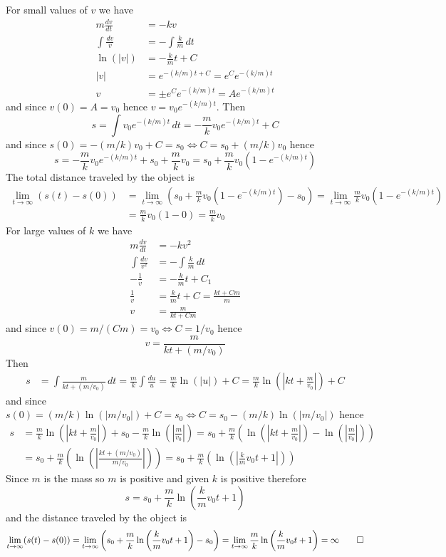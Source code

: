 \begin{solution}
    For small values of \(v\) we have
    \begin{align*}
        m\frac{dv}{dt} &= -kv \\
        \int\frac{dv}{v} &= -\int\frac{k}{m}\,dt \\
        \ln(|v|) &= -\frac{k}{m}t+C \\
        |v| &= e^{-(k/m)t+C}=e^Ce^{-(k/m)t} \\
        v &= \pm e^Ce^{-(k/m)t}=Ae^{-(k/m)t}
    \end{align*}
    and since \(v(0)=A=v_0\) hence \(v=v_0e^{-(k/m)t}\).
    Then
    \[s=\int v_0e^{-(k/m)t}\,dt=-\frac{m}{k}v_0e^{-(k/m)t}+C\]
    and since \(s(0)=-(m/k)v_0+C=s_0\iff C=s_0+(m/k)v_0\) hence
    \[s=-\frac{m}{k}v_0e^{-(k/m)t}+s_0+\frac{m}{k}v_0
    =s_0+\frac{m}{k}v_0(1-e^{-(k/m)t})\]
    The total distance traveled by the object is
    \begin{align*}
        \lim_{t\to\infty}(s(t)-s(0))
        &= \lim_{t\to\infty}\left(s_0+\frac{m}{k}v_0(1-e^{-(k/m)t})-s_0\right)
        =\lim_{t\to\infty}\frac{m}{k}v_0(1-e^{-(k/m)t}) \\
        &= \frac{m}{k}v_0(1-0)=\frac{m}{k}v_0
    \end{align*}
    For large values of \(k\) we have
    \begin{align*}
        m\frac{dv}{dt} &= -kv^2 \\
        \int\frac{dv}{v^2} &= -\int\frac{k}{m}\,dt \\
        -\frac{1}{v} &= -\frac{k}{m}t+C_1 \\
        \frac{1}{v} &= \frac{k}{m}t+C=\frac{kt+Cm}{m} \\
        v &= \frac{m}{kt+Cm}
    \end{align*}
    and since \(v(0)=m/(Cm)=v_0\iff C=1/v_0\) hence
    \[v=\frac{m}{kt+(m/v_0)}\]
    Then
    \begin{align*}
        s &= \int\frac{m}{kt+(m/v_0)}\,dt=\frac{m}{k}\int\frac{du}{u}
        =\frac{m}{k}\ln(|u|)+C
        =\frac{m}{k}\ln\left(\left|kt+\frac{m}{v_0}\right|\right)+C
    \end{align*}
    and since \(s(0)=(m/k)\ln(|m/v_0|)+C=s_0\iff C=s_0-(m/k)\ln(|m/v_0|)\)
    hence
    \begin{align*}
        s &= \frac{m}{k}\ln\left(\left|kt+\frac{m}{v_0}\right|\right)+s_0
        -\frac{m}{k}\ln\left(\left|\frac{m}{v_0}\right|\right)
        =s_0+\frac{m}{k}\left(\ln\left(\left|kt+\frac{m}{v_0}\right|\right)
        -\ln\left(\left|\frac{m}{v_0}\right|\right)\right) \\
        &= s_0+\frac{m}{k}
        \left(\ln\left(\left|\frac{kt+(m/v_0)}{m/v_0}\right|\right)\right)
        =s_0+\frac{m}{k}
        \left(\ln\left(\left|\frac{k}{m}v_0t+1\right|\right)\right)
    \end{align*}
    Since \(m\) is the mass so \(m\) is positive and given \(k\) is positive
    therefore
    \[s=s_0+\frac{m}{k}\ln\left(\frac{k}{m}v_0t+1\right)\]
    and the distance traveled by the object is
    \[\lim_{t\to\infty}(s(t)-s(0))
    =\lim_{t\to\infty}\left(s_0
    +\frac{m}{k}\ln\left(\frac{k}{m}v_0t+1\right)-s_0\right)=
    \lim_{t\to\infty}\frac{m}{k}\ln\left(\frac{k}{m}v_0t+1\right)
    =\infty\qedhere\]
\end{solution}
